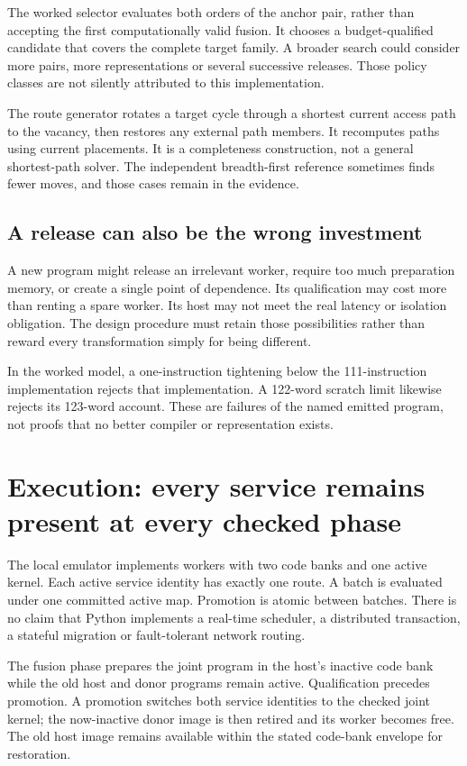 \documentclass[11pt,letterpaper]{article}
\theoremstyle{definition}\newtheorem{definition}[theorem]{Definition}
\theoremstyle{remark}\newtheorem{remark}[theorem]{Remark}
\begin{document}
The worked selector evaluates both orders of the anchor pair, rather than accepting the first computationally valid fusion. It chooses a budget-qualified candidate that covers the complete target family. A broader search could consider more pairs, more representations or several successive releases. Those policy classes are not silently attributed to this implementation.

The route generator rotates a target cycle through a shortest current access path to the vacancy, then restores any external path members. It recomputes paths using current placements. It is a completeness construction, not a general shortest-path solver. The independent breadth-first reference sometimes finds fewer moves, and those cases remain in the evidence.

\subsection{A release can also be the wrong investment}
A new program might release an irrelevant worker, require too much preparation memory, or create a single point of dependence. Its qualification may cost more than renting a spare worker. Its host may not meet the real latency or isolation obligation. The design procedure must retain those possibilities rather than reward every transformation simply for being different.

In the worked model, a one-instruction tightening below the 111-instruction implementation rejects that implementation. A 122-word scratch limit likewise rejects its 123-word account. These are failures of the named emitted program, not proofs that no better compiler or representation exists.

\section{Execution: every service remains present at every checked phase}
\label{sec:emulator}
The local emulator implements workers with two code banks and one active kernel. Each active service identity has exactly one route. A batch is evaluated under one committed active map. Promotion is atomic between batches. There is no claim that Python implements a real-time scheduler, a distributed transaction, a stateful migration or fault-tolerant network routing.

The fusion phase prepares the joint program in the host's inactive code bank while the old host and donor programs remain active. Qualification precedes promotion. A promotion switches both service identities to the checked joint kernel; the now-inactive donor image is then retired and its worker becomes free. The old host image remains available within the stated code-bank envelope for restoration.
\end{document}
